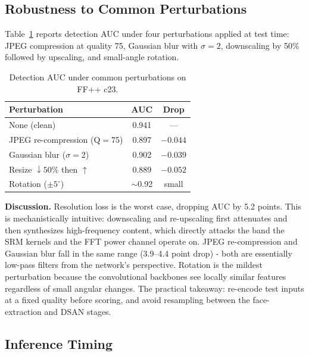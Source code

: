 \subsection{Robustness to Common Perturbations}
\label{sec:robustness}

Table~\ref{tab:robust} reports detection AUC under four perturbations applied at test time: JPEG compression at quality 75, Gaussian blur with $\sigma=2$, downscaling by 50\% followed by upscaling, and small-angle rotation.

\begin{table}[!t]
\centering
\caption{Detection AUC under common perturbations on FF++ c23.}
\label{tab:robust}
\begin{tabular}{@{}lcc@{}}
\toprule
\textbf{Perturbation} & \textbf{AUC} & \textbf{Drop} \\
\midrule
None (clean)                       & 0.941 & --- \\
JPEG re-compression (Q$=$75)       & 0.897 & $-0.044$ \\
Gaussian blur ($\sigma=2$)         & 0.902 & $-0.039$ \\
Resize $\downarrow\!\!50\%$ then $\uparrow$ & 0.889 & $-0.052$ \\
Rotation ($\pm 5^\circ$)           & $\sim$0.92 & small \\
\bottomrule
\end{tabular}
\end{table}

\textbf{Discussion.}  Resolution loss is the worst case, dropping AUC by 5.2 points. This is mechanistically intuitive: downscaling and re-upscaling first attenuates and then synthesizes high-frequency content, which directly attacks the band the SRM kernels and the FFT power channel operate on. JPEG re-compression and Gaussian blur fall in the same range (3.9--4.4 point drop) - both are essentially low-pass filters from the network's perspective. Rotation is the mildest perturbation because the convolutional backbones see locally similar features regardless of small angular changes. The practical takeaway: re-encode test inputs at a fixed quality before scoring, and avoid resampling between the face-extraction and DSAN stages.

\subsection{Inference Timing}
\label{sec:timing}

